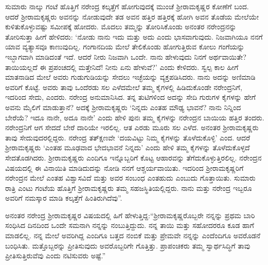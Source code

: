 ಸುಮಾರು ನಾಲ್ಕು ಗಂಟೆ ಹೊತ್ತಿಗೆ ನರೇಂದ್ರ ಕಲ್ಕತ್ತೆಗೆ ಹೋಗುವುದಕ್ಕೆ ಮುಂಚೆ ಶ‍್ರೀರಾಮಕೃಷ್ಣರ ಕೋಣೆಗೆ ಬಂದ. ಆದರೆ ಶ‍್ರೀರಾಮಕೃಷ್ಣರು ಅವನನ್ನು ನೋಡುವುದೇ ತಡ ಅವನ ಹತ್ತಿರ ಹತ್ತಿರಕ್ಕೆ ಹೋಗಿ ಅವನ ತೊಡೆಯ ಮೇಲೆಯೇ ಕುಳಿತುಕೊಳ್ಳುವಷ್ಟು ಸಮೀಪಕ್ಕೆ ಹೋದರು. ಮೊದಲು ತಮ್ಮನ್ನು ತೋರಿಸಿಕೊಂಡು ಅನಂತರ ನರೇಂದ್ರನನ್ನು ತೋರಿಸುತ್ತಾ ಹೀಗೆ ಹೇಳಿದರು: ‘ನೋಡು ನಾನು ಇದು ಮತ್ತು ಅದು ಎಂದು ಭಾಸವಾಗುವುದು. ನಿಜವಾಗಿಯೂ ನನಗೆ ಯಾವ ವ್ಯತ್ಯಾಸವೂ ಕಾಣುವುದಿಲ್ಲ. ಗಂಗಾನದಿಯ ಮೇಲೆ ತೇಲಿಕೊಂಡು ಹೋಗುತ್ತಿರುವ ಕೋಲು ಗಂಗೆಯನ್ನು ಇಬ್ಭಾಗವಾಗಿ ಮಾಡಿದಂತೆ ಇದೆ. ಆದರೆ ನೀರು ನಿಜವಾಗಿ ಒಂದೇ. ನಾನು ಹೇಳುವುದು ನಿನಗೆ ಅರ್ಥವಾಯಿತೇ? ತಾಯಿಯಲ್ಲದೆ ಈ ಪ್ರಪಂಚದಲ್ಲಿ ಮತ್ತೇನಿದೆ! ನೀನು ಏನು ಹೇಳುವೆ?’ ಎಂದು ಕೇಳಿದರು. ಸ್ವಲ್ಪ ಕಾಲ ಹೀಗೆ ಮಾತನಾಡಿದ ಮೇಲೆ ಅವರು ಗುಡುಗುಡಿಯನ್ನು ಸೇದಲು ಇಚ್ಛೆಯನ್ನು ವ್ಯಕ್ತಪಡಿಸಿದರು. ನಾನು ಅದನ್ನು ಅಣಿಮಾಡಿ ಅವರಿಗೆ ಕೊಟ್ಟೆ. ಅವರು ತಾವು ಒಂದೆರಡು ಸಲ ಎಳೆದಮೇಲೆ ತಮ್ಮ ಕೈಗಳಲ್ಲಿ ಹಿಡಿದುಕೊಂಡೇ ನರೇಂದ್ರನಿಗೆ, ಇದರಿಂದ ಸೇದು, ಎಂದರು. ನರೇಂದ್ರ ಅನುಮಾನಿಸಿದ. ತನ್ನ ತುಟಿಗಳಿಂದ ಅದನ್ನು ಸೇದಿ ಗುರುಗಳ ಕೈಗಳನ್ನು ಹೇಗೆ ಅವನು ಮೈಲಿಗೆ ಮಾಡುತ್ತಾನೆ? ಅದಕ್ಕೆ ಶ‍್ರೀರಾಮಕೃಷ್ಣರು ‘ನಿನ್ನದು ಎಂತಹ ಮೌಢ್ಯ ಭಾವನೆ? ನಾನು ನಿನ್ನಿಂದ ಬೇರೆಯೆ? ಇದೂ ನಾನೇ, ಅದೂ ನಾನೇ’ ಎಂದು ಹೇಳಿ ಪುನಃ ತಮ್ಮ ಕೈಗಳನ್ನು ನರೇಂದ್ರನ ಬಾಯಿಯ ಹತ್ತಿರ ತಂದರು. ನರೇಂದ್ರನಿಗೆ ಆಗ ಸೇದದೆ ಬೇರೆ ದಾರಿಯೇ ಇರಲಿಲ್ಲ. ಆತ ಎರಡು ಮೂರು ಸಲ ಎಳೆದ. ಅನಂತರ ಶ‍್ರೀರಾಮಕೃಷ್ಣರು ತಾವು ಸೇದುವುದರಲ್ಲಿದ್ದರು. ನರೇಂದ್ರ ತತ್‍ಕ್ಷಣವೇ ‘ದಯವಿಟ್ಟು ನಿಮ್ಮ ಕೈಗಳನ್ನು ತೊಳೆದುಕೊಳ್ಳಿ’ ಎಂದ. ಆದರೆ ಶ‍್ರೀರಾಮಕೃಷ್ಣರು ‘ಎಂತಹ ಮೂಢವಾದ ಭೇದಭಾವನೆ ನಿನ್ನದು’ ಎಂದು ಹೇಳಿ ತಮ್ಮ ಕೈಗಳನ್ನು ತೊಳೆದುಕೊಳ್ಳದೆ ಸೇದತೊಡಗಿದರು. ಶ‍್ರೀರಾಮಕೃಷ್ಣರು ಎಂದಿಗೂ ಇನ್ನೊಬ್ಬರಿಗೆ ಕೊಟ್ಟ ಆಹಾರವನ್ನು ತೆಗೆದುಕೊಳ್ಳುತ್ತಿರಲಿಲ್ಲ. ನರೇಂದ್ರನ ವಿಷಯದಲ್ಲಿ ಈ ವಿನಾಯಿತಿ ಮಾಡಿದುದನ್ನು ನೋಡಿ ನನಗೆ ಆಶ್ಚರ್ಯವಾಯಿತು. ಇದರಿಂದ ಶ‍್ರೀರಾಮಕೃಷ್ಣರಿಗೆ ನರೇಂದ್ರನ ಮೇಲೆ ಎಂತಹ ವಿಶ್ವಾಸವಿದೆ ಮತ್ತು ಅವರ ಸಂಬಂಧ ಎಂತಹುದು ಎಂಬುದು ಗೊತ್ತಾಯಿತು. ಸುಮಾರು ರಾತ್ರಿ ಎಂಟು ಗಂಟೆಯ ಹೊತ್ತಿಗೆ ಶ‍್ರೀರಾಮಕೃಷ್ಣರು ತಮ್ಮ ಸಹಜಸ್ಥಿತಿಯಲ್ಲಿದ್ದರು. ನಾನು ಮತ್ತು ನರೇಂದ್ರ ಇಬ್ಬರೂ ಅವರಿಗೆ ನಮಸ್ಕಾರ ಮಾಡಿ ಕಲ್ಕತ್ತೆಗೆ ಹಿಂತಿರುಗಿದೆವು”.

ಅನಂತರ ನರೇಂದ್ರ ಶ‍್ರೀರಾಮಕೃಷ್ಣರ ವಿಷಯದಲ್ಲಿ ಹಿಗೆ ಹೇಳುತ್ತಿದ್ದ:\break “ಶ‍್ರೀರಾಮಕೃಷ್ಣ\-ರೊಬ್ಬರೇ ನನ್ನನ್ನು ಪ್ರಥಮ ಬಾರಿ ಸಂಧಿಸಿದ ದಿನದಿಂದ ಒಂದೇ ಸಮನಾಗಿ ನನ್ನನ್ನು ನಂಬುತ್ತಿದ್ದುದು. ನನ್ನ ತಾಯಿ ಮತ್ತು ಸಹೋದರರೂ ಕೂಡ ಹಾಗೆ ಮಾಡಲಿಲ್ಲ. ನನ್ನ ಮೇಲೆ ಅವರಿಗಿದ್ದ ಎಂದಿಗೂ ಬತ್ತದ ನಂಬಿಕೆ ಮತ್ತು ಪ್ರೇಮವೇ ನನ್ನನ್ನು ಎಂದೆಂದಿಗೂ ಅವರೊಡನೆ ಬಂಧಿಸಿತು. ಮತ್ತೊಬ್ಬರನ್ನು ಪ್ರೀತಿಸುವುದು ಅವರೊಬ್ಬರಿಗೇ ಗೊತ್ತಿತ್ತು. ಪ್ರಾಪಂಚಿಕರು ತಮ್ಮ ಸ್ವಾರ್ಥಸಿದ್ಧಿಗೆ ತಾವು ಪ್ರೀತಿಸುತ್ತಿರುವೆವು ಎಂದು ನಟಿಸುವರು ಅಷ್ಟೆ.”

